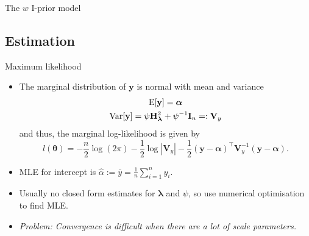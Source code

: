 \documentclass[]{beamer}\usepackage[]{graphicx}\usepackage[]{color}
\newcommand{\E}{\text{\normalfont E}}
\newcommand{\Var}{\text{\normalfont Var}}
\begin{document}
\begin{frame}[label=c]{The $w$ I-prior model}
\begin{overlayarea}{\textwidth}{8.2cm}
\begin{itemize}
	
	
			
		\end{itemize}	
		
	\end{overlayarea}

\end{frame}

\subsection{Estimation}

\begin{frame}{Maximum likelihood}
	\begin{itemize}
		\item The marginal distribution of $\mathbf y$ is normal with mean and variance
		\begin{align*}
			\begin{gathered}
				\E[\mathbf y] = \boldsymbol\alpha \\
				\Var[\mathbf y] = \psi \mathbf  H_{\boldsymbol\lambda}^2 + \psi^{-1}\mathbf I_n =: \mathbf V_y
			\end{gathered}
		\end{align*}
		\pause
		and thus, the marginal log-likelihood is given by
		\[
			l(\boldsymbol{\theta}) = - \frac{n}{2} \log(2\pi) - \frac{1}{2} \log | \mathbf V_y | - \frac{1}{2}  (\mathbf y - \boldsymbol\alpha)^\top \mathbf V_y^{-1} (\mathbf y - \boldsymbol\alpha).
		\]
		\pause
		\item MLE for intercept is $\hat\alpha := \bar y = \frac{1}{n}\sum_{i=1}^n y_i$.
		\pause
		\item Usually no closed form estimates for $\boldsymbol{\lambda}$ and $\psi$, so use numerical optimisation to find MLE.
		\pause
		\item \textit{Problem: Convergence is difficult when there are a lot of scale parameters.}
	\end{itemize}
\end{frame}
\end{document}
